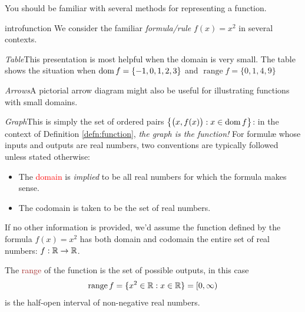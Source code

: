 
You should be familiar with several methods for representing a function.

\begin{example}{}{introfunction}
	We consider the familiar \emph{formula/rule} $f(x)=x^2$ in several contexts.
	\begin{description}\itemsep8pt
	  \begin{minipage}[t]{0.71\linewidth}\vspace{-5pt}
	  	\item \emph{Table}\lstsp This presentation is most helpful when the domain is very small. The table shows the situation when $\operatorname{dom} f=\{-1,0,1,2,3\}$ and $\operatorname{range}f=\{0,1,4,9\}$
	  
	  	\item \emph{Arrows}\lstsp A pictorial arrow diagram might also be useful for illustrating functions with small domains.
	  
	  
	  	\item \emph{Graph}\lstsp This is simply the set of ordered pairs $\bigl\{\bigl(x,f(x)\bigr):x\in\operatorname{dom} f\bigr\}$: in the context of Definition \ref{defn:function}, \emph{the graph is the function!}\smallbreak
		 	For formulæ whose inputs and outputs are real numbers, two conventions are typically followed unless stated otherwise:
		 	\begin{itemize}
		 	  \item The \textcolor{red}{domain} is \emph{implied} to be all real numbers for which the formula makes sense.
				\item The codomain is taken to be the set of real numbers.
			\end{itemize}
			If no other information is provided, we'd assume the function defined by the formula $f(x)=x^2$ has both domain and codomain the entire set of real numbers: $f:\mathbb{R}\to\mathbb{R}$.
			\smallbreak
			
			The \textcolor{Brown}{range} of the function is the set of possible outputs, in this case
			\[
				\operatorname{range}f=\{x^2\in\mathbb{R}:x\in\mathbb{R}\}=[0,\infty)
			\]
			is the half-open interval of non-negative real numbers.
			\smallbreak
			

\end{minipage}
\end{description}
\end{example}
